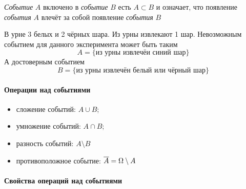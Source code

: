 \begin{definition}
	\textit{Событие} $A$ включено в \textit{событие} $B$ есть $A \subset B$ и означает, что появление \textit{события} $A$ влечёт за собой появление \textit{события} $B$
\end{definition}

\begin{example}
	В урне 3 белых и 2 чёрных шара. Из урны извлекают 1 шар. Невозможным событием для данного эксперимента может быть таким
	\[
		A = \{ \text{из урны извлечёи синий шар} \}
	\]
	А достоверным событием
	\[
		B = \{ \text{из урны извлечён белый или чёрный шар} \}
	\]
	
\end{example}




\paragraph{Операции над событиями}

\begin{itemize}
	\item сложение событий: $A \cup B$;
	\item умножение событий: $A \cap B$;
	\item разность событий: $A \setminus B$
	\item противоположное событие: $\overline{A} = \Omega \setminus A$	
\end{itemize}



\paragraph{Свойства операций над событиями}

